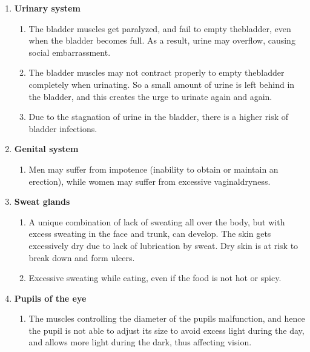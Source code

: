 \begin{enumerate}[•]
\begin{enumerate}[o]
\end{enumerate}
\item \textbf{Urinary system}
\vspace{-\topsep}
\begin{enumerate}[o]
\itemsep=0pt
\item The bladder muscles get paralyzed, and fail to empty the\break bladder, even when the bladder becomes full. As a result, urine may overflow, causing social embarrassment.
\item The bladder muscles may not contract properly to empty the\break bladder completely when urinating. So a small amount of urine is left behind in the bladder, and this creates the urge to urinate again and again.
\item Due to the stagnation of urine in the bladder, there is a higher risk of bladder infections.
\end{enumerate}
\item \textbf{Genital system}
\vspace{-\topsep}
\begin{enumerate}[o]
\itemsep=0pt
\item Men may suffer from impotence (inability to obtain or maintain an erection), while women may suffer from excessive vaginal\break dryness.
\end{enumerate}
\item \textbf{Sweat glands}
\vspace{-\topsep}
\begin{enumerate}[o]
\itemsep=0pt
\item A unique combination of lack of sweating all over the body, but with excess sweating in the face and trunk, can develop. The skin gets excessively dry due to lack of lubrication by sweat. Dry skin is at risk to break down and form ulcers.
\item Excessive sweating while eating, even if the food is not hot or spicy.
\end{enumerate}
\item \textbf{Pupils of the eye}
\vspace{-\topsep}
\begin{enumerate}[o]
\itemsep=0pt
\item The muscles controlling the diameter of the pupils malfunction, and hence the pupil is not able to adjust its size to avoid excess light during the day, and allows more light during the dark, thus affecting vision.
\end{enumerate}
\end{enumerate}

